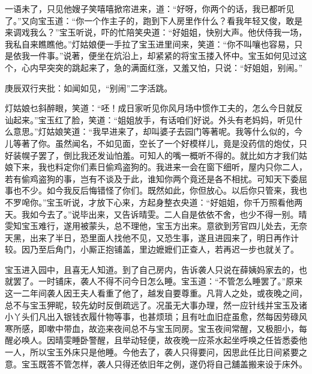 \begin{parag}
    一语未了，只见他嫂子笑嘻嘻掀帘进来，道：“好呀，你两个的话，我已都听见了。”又向宝玉道：“你一个作主子的，跑到下人房里作什么？看我年轻又俊，敢是来调戏我么？”宝玉听说，吓的忙陪笑央道：“好姐姐，快别大声。他伏侍我一场，我私自来瞧瞧他。”灯姑娘便一手拉了宝玉进里间来，笑道：“你不叫嚷也容易，只是依我一件事。”说著，便坐在炕沿上，却紧紧的将宝玉搂入怀中。宝玉如何见过这个，心内早突突的跳起来了，急的满面红涨，又羞又怕，只说：“好姐姐，别闹。”\begin{note}庚辰双行夹批：如闻如见，“别闹”二字活跳。\end{note}灯姑娘乜斜醉眼，笑道：“呸！成日家听见你风月场中惯作工夫的，怎么今日就反讪起来。”宝玉红了脸，笑道：“姐姐放手，有话咱们好说。外头有老妈妈，听见什么意思。”灯姑娘笑道：“我早进来了，却叫婆子去园门等著呢。我等什么似的，今儿等著了你。虽然闻名，不如见面，空长了一个好模样儿，竟是没药信的炮仗，只好装幌子罢了，倒比我还发讪怕羞。可知人的嘴一概听不得的。就比如方才我们姑娘下来，我也料定你们素日偷鸡盗狗的。我进来一会在窗下细听，屋内只你二人，若有偷鸡盗狗的事，岂有不谈及于此，谁知你两个竟还是各不相扰。可知天下委屈事也不少。如今我反后悔错怪了你们。既然如此，你但放心。以后你只管来，我也不罗唣你。”宝玉听说，才放下心来，方起身整衣央道：“好姐姐，你千万照看他两天。我如今去了。”说毕出来，又告诉晴雯。二人自是依依不舍，也少不得一别。晴雯知宝玉难行，遂用被蒙头，总不理他，宝玉方出来。意欲到芳官四儿处去，无奈天黑，出来了半日，恐里面人找他不见，又恐生事，遂且进园来了，明日再作计较。因乃至后角门，小厮正抱铺盖，里边嬷嬷们正查人，若再迟一步也就关了。
\end{parag}


\begin{parag}
    宝玉进入园中，且喜无人知道。到了自己房内，告诉袭人只说在薛姨妈家去的，也就罢了。一时铺床，袭人不得不问今日怎么睡。宝玉道：“不管怎么睡罢了。”原来这一二年间袭人因王夫人看重了他了，越发自要尊重。凡背人之处，或夜晚之间，总不与宝玉狎昵，较先幼时反倒疏远了。况虽无大事办理，然一应针线并宝玉及诸小丫头们凡出入银钱衣履什物等事，也甚烦琐；且有吐血旧症虽愈，然每因劳碌风寒所感，即嗽中带血，故迩来夜间总不与宝玉同房。宝玉夜间常醒，又极胆小，每醒必唤人。因晴雯睡卧警醒，且举动轻便，故夜晚一应茶水起坐呼唤之任皆悉委他一人，所以宝玉外床只是他睡。今他去了，袭人只得要问，因思此任比日间紧要之意。宝玉既答不管怎样，袭人只得还依旧年之例，遂仍将自己舖盖搬来设于床外。
\end{parag}


